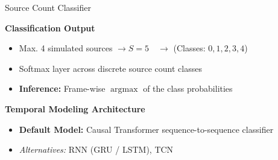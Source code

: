 \documentclass[8pt,hyperref={pdfpagelabels=true},xcolor=table,aspectratio=169]{beamer}
\DeclareMathOperator*{\argmax}{argmax}
\begin{document}

    



\begin{frame}{Source Count Classifier}


    \textbf{Classification Output}
    \begin{itemize}
        \item Max. 4 simulated sources $\rightarrow S = 5\quad\rightarrow$ (Classes: $0, 1, 2, 3, 4$)
        \item Softmax layer across discrete source count classes
        \item \textbf{Inference:} Frame-wise $\argmax$ of the class probabilities
    \end{itemize}
    \vspace{2em}
    \textbf{Temporal Modeling Architecture}
    \begin{itemize}
        \item \textbf{Default Model:} Causal Transformer sequence-to-sequence classifier
        \item \textit{Alternatives:} RNN (GRU / LSTM), TCN
    \end{itemize}
    \vspace{1em}
\end{frame}
\end{document}
